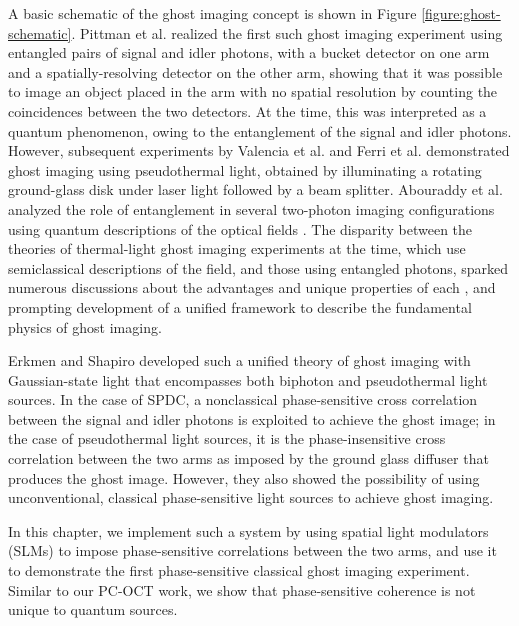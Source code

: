 A basic schematic of the ghost imaging concept is shown in Figure \ref{figure:ghost-schematic}. Pittman et al. realized the first such ghost imaging experiment \cite{pittman-ghost} using entangled pairs of signal and idler photons, with a bucket detector on one arm and a spatially-resolving detector on the other arm, showing that it was possible to image an object placed in the arm with no spatial resolution by counting the coincidences between the two detectors. At the time, this was interpreted as a quantum phenomenon, owing to the entanglement of the signal and idler photons. However, subsequent experiments by Valencia et al. \cite{valencia-two} and Ferri et al. \cite{ferri-high} demonstrated ghost imaging using pseudothermal light, obtained by illuminating a rotating ground-glass disk under laser light followed by a beam splitter. Abouraddy et al. analyzed the role of entanglement in several two-photon imaging configurations using quantum descriptions of the optical fields \cite{abouraddy-role,abouraddy-fourier}. The disparity between the theories of thermal-light ghost imaging experiments at the time, which use semiclassical descriptions of the field, and those using entangled photons, sparked numerous discussions about the advantages and unique properties of each \cite{dangelo-identifying,bennink-quantum,gatti-entangled}, and prompting development of a unified framework to describe the fundamental physics of ghost imaging.

Erkmen and Shapiro developed such a unified theory of ghost imaging with Gaussian-state light \cite{erkmen-unified} that encompasses both biphoton and pseudothermal light sources. In the case of SPDC, a nonclassical phase-sensitive cross correlation between the signal and idler photons is exploited to achieve the ghost image; in the case of pseudothermal light sources, it is the phase-insensitive cross correlation between the two arms as imposed by the ground glass diffuser that produces the ghost image. However, they also showed the possibility of using unconventional, classical phase-sensitive light sources to achieve ghost imaging.

In this chapter, we implement such a system by using spatial light modulators (SLMs) to impose phase-sensitive correlations between the two arms, and use it to demonstrate the first phase-sensitive classical ghost imaging experiment. Similar to our PC-OCT work, we show that phase-sensitive coherence is not unique to quantum sources.

